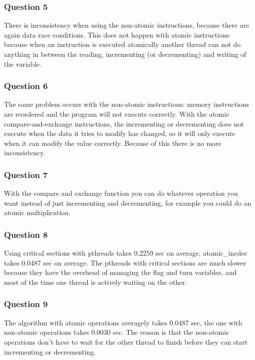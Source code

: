 \documentclass[12pt,a4paper,oneside]{article}
\begin{document}
\subsubsection*{Question 5}
There is inconsistency when using the non-atomic instructions, because there are again data race conditions. This does not happen with atomic instructions because when an instruction is executed atomically another thread can not do anything in between the reading, incrementing (or decrementing) and writing of the variable.

\subsubsection*{Question 6}
The same problem occurs with the non-atomic instructions: memory instructions are reordered and the program will not execute correctly. With the atomic compare-and-exchange instructions, the incrementing or decrementing does not execute when the data it tries to modify has changed, so it will only execute when it can modify the value correctly. Because of this there is no more inconsistency.

\subsubsection*{Question 7}
With the compare and exchange function you can do whatever operation you want instead of just incrementing and decrementing, for example you could do an atomic multiplication.

\subsubsection*{Question 8}
Using critical sections with pthreads takes 0.2259 sec on average, atomic\_incdec takes 0.0487 sec on average. The pthreads with critical sections are much slower because they have the overhead of managing the flag and turn variables, and most of the time one thread is actively waiting on the other. 

\subsubsection*{Question 9}
The algorithm with atomic operations averagely takes 0.0487 sec, the one with non-atomic operations takes 0.0030 sec. The reason is that the non-atomic operations don't have to wait for the other thread to finish before they can start incrementing or decrementing.
\end{document}
